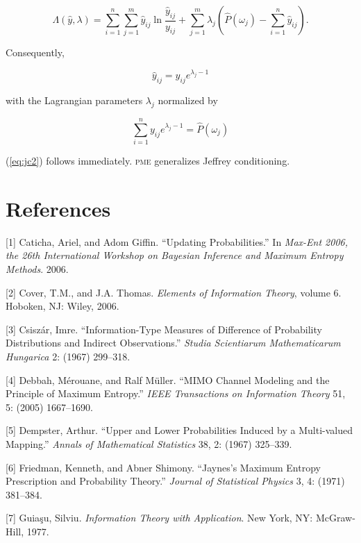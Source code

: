 \documentclass[entropy,article,submit,oneauthor,pdftex,12pt,a4paper]{mdpi}
\begin{document}
\begin{equation}
  \label{eq:jclag}
  \Lambda(\hat{y},\lambda)=\sum_{i=1}^{n}\sum_{j=1}^{m}\hat{y}_{ij}\ln\frac{\hat{y}_{ij}}{y_{ij}}+\sum_{j=1}^{m}\lambda_{j}\left(\hat{P}(\omega_{j})-\sum_{i=1}^{n}\hat{y}_{ij}\right).
\end{equation}

{\noindent}Consequently,

\begin{equation}
  \label{eq:jc4}
  \hat{y}_{ij}=y_{ij}e^{\lambda_{j}-1}
\end{equation}

{\noindent}with the Lagrangian parameters $\lambda_{j}$ normalized by

\begin{equation}
  \label{eq:jc5}
  \sum_{i=1}^{n}y_{ij}e^{\lambda_{j}-1}=\hat{P}(\omega_{j})
\end{equation}

{\noindent}(\ref{eq:jc2}) follows immediately. \textsc{pme}
generalizes Jeffrey conditioning.

\section{References}
\label{References}

[1] Caticha, Ariel, and Adom Giffin. ``Updating Probabilities.'' In \emph{Max-Ent 2006, the 26th International Workshop on Bayesian Inference and Maximum Entropy Methods}. 2006.

[2] Cover, T.M., and J.A. Thomas. \emph{Elements of Information Theory}, volume 6. Hoboken, NJ: Wiley, 2006.

[3] Csisz{\'a}r, Imre. ``Information-Type Measures of Difference of Probability Distributions and Indirect Observations.'' \emph{Studia Scientiarum Mathematicarum Hungarica} 2: (1967) 299--318.

[4] Debbah, M{\'e}rouane, and Ralf M{\"u}ller. ``MIMO Channel Modeling and the Principle of Maximum Entropy.'' \emph{IEEE Transactions on Information Theory} 51, 5: (2005) 1667--1690.

[5] Dempster, Arthur. ``Upper and Lower Probabilities Induced by a Multi-valued Mapping.'' \emph{Annals of Mathematical Statistics} 38, 2: (1967) 325--339.

[6] Friedman, Kenneth, and Abner Shimony. ``Jaynes's Maximum Entropy Prescription and Probability Theory.'' \emph{Journal of Statistical Physics} 3, 4: (1971) 381--384.

[7] Guia{\c{s}}u, Silviu. \emph{Information Theory with Application}. New York, NY: McGraw-Hill, 1977. 
\end{document}

